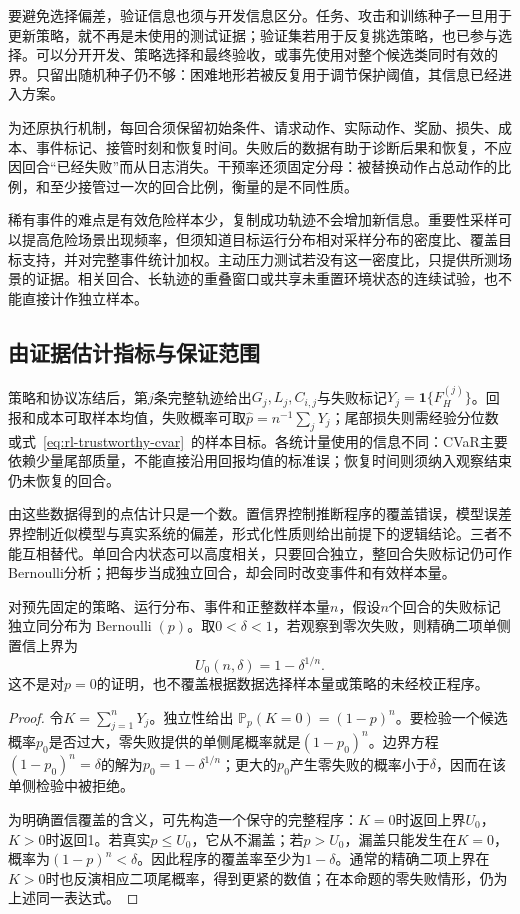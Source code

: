 要避免选择偏差，验证信息也须与开发信息区分。任务、攻击和训练种子一旦用于更新策略，就不再是未使用的测试证据；验证集若用于反复挑选策略，也已参与选择。可以分开开发、策略选择和最终验收，或事先使用对整个候选类同时有效的界。只留出随机种子仍不够：困难地形若被反复用于调节保护阈值，其信息已经进入方案。

为还原执行机制，每回合须保留初始条件、请求动作、实际动作、奖励、损失、成本、事件标记、接管时刻和恢复时间。失败后的数据有助于诊断后果和恢复，不应因回合“已经失败”而从日志消失。干预率还须固定分母：被替换动作占总动作的比例，和至少接管过一次的回合比例，衡量的是不同性质。

稀有事件的难点是有效危险样本少，复制成功轨迹不会增加新信息。重要性采样可以提高危险场景出现频率，但须知道目标运行分布相对采样分布的密度比、覆盖目标支持，并对完整事件统计加权。主动压力测试若没有这一密度比，只提供所测场景的证据。相关回合、长轨迹的重叠窗口或共享未重置环境状态的连续试验，也不能直接计作独立样本。

\subsection{由证据估计指标与保证范围}
\label{sec:rl-trustworthy-inference}

策略和协议冻结后，第$j$条完整轨迹给出$G_j,L_j,C_{i,j}$与失败标记$Y_j=\mathbf1\{F_H^{(j)}\}$。回报和成本可取样本均值，失败概率可取$\widehat p=n^{-1}\sum_jY_j$；尾部损失则需经验分位数或式~\eqref{eq:rl-trustworthy-cvar}~的样本目标。各统计量使用的信息不同：CVaR主要依赖少量尾部质量，不能直接沿用回报均值的标准误；恢复时间则须纳入观察结束仍未恢复的回合。

由这些数据得到的点估计只是一个数。置信界控制推断程序的覆盖错误，模型误差界控制近似模型与真实系统的偏差，形式化性质则给出前提下的逻辑结论。三者不能互相替代。单回合内状态可以高度相关，只要回合独立，整回合失败标记仍可作Bernoulli分析；把每步当成独立回合，却会同时改变事件和有效样本量。

\begin{theorem}[零失败记录的单侧上界]
  \label{thm:rl-trustworthy-zero-failure}
  对预先固定的策略、运行分布、事件和正整数样本量$n$，假设$n$个回合的失败标记独立同分布为$\operatorname{Bernoulli}(p)$。取$0<\delta<1$，若观察到零次失败，则精确二项单侧置信上界为
  \[
    U_0(n,\delta)=1-\delta^{1/n}.
  \]
  这不是对$p=0$的证明，也不覆盖根据数据选择样本量或策略的未经校正程序。
\end{theorem}
\begin{proof}
  令$K=\sum_{j=1}^nY_j$。独立性给出
  $\mathbb P_p(K=0)=(1-p)^n$。要检验一个候选概率$p_0$是否过大，零失败提供的单侧尾概率就是$(1-p_0)^n$。边界方程
  $(1-p_0)^n=\delta$的解为$p_0=1-\delta^{1/n}$；更大的$p_0$产生零失败的概率小于$\delta$，因而在该单侧检验中被拒绝。

  为明确置信覆盖的含义，可先构造一个保守的完整程序：$K=0$时返回上界$U_0$，$K>0$时返回1。若真实$p\leq U_0$，它从不漏盖；若$p>U_0$，漏盖只能发生在$K=0$，概率为$(1-p)^n<\delta$。因此程序的覆盖率至少为$1-\delta$。通常的精确二项上界在$K>0$时也反演相应二项尾概率，得到更紧的数值；在本命题的零失败情形，仍为上述同一表达式。
\end{proof}

